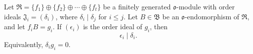 Let $\mathfrak{R} = \{f_1\} \oplus \{f_2\} \oplus \cdots \oplus \{f_t\}$ be a finitely generated $\mathfrak{o}$-module with order ideals $\mathfrak{J}_i = (\delta_i)$, where $\delta_i \mid \delta_j$ for $i \leq j$. Let $B \in \mathfrak{B}$ be an $\mathfrak{o}$-endomorphism of $\mathfrak{R}$, and let $f_i B = g_i$. If $(\epsilon_i)$ is the order ideal of $g_i$, then
$$\epsilon_i \mid \delta_i.$$
Equivalently, $\delta_i g_i = 0$.

